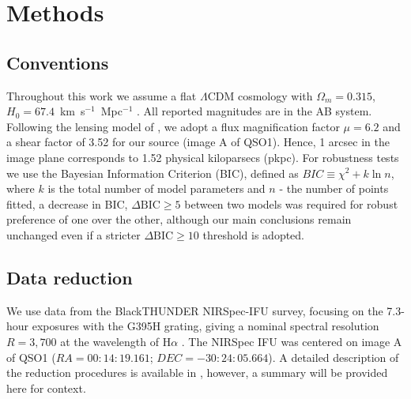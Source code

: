 \documentclass[twocolumn, fleqn]{doc_class}
\begin{document}
\clearpage
{}

\clearpage
\makeatletter
\renewcommand{\fnum@figure}{Extended Data Fig. \thefigure}
\renewcommand{\fnum@table}{Extended Data Table \thetable}
\makeatother
\setcounter{figure}{0}
\setcounter{table}{0}
\setcounter{footnote}{0}


\newpage


\section*{Methods}
\subsection*{Conventions}
Throughout this work we assume a flat $\Lambda$CDM cosmology with $\Omega_m = 0.315$, $H_0 = 67.4$~km~s$^{-1}$~Mpc$^{-1}$ . All reported magnitudes are in the AB system. Following the lensing model of , we adopt a flux magnification factor $\mu = 6.2$ and a shear factor of 3.52 for our source (image A of QSO1). Hence, 1 arcsec in the image plane corresponds to 1.52 physical kiloparsecs (pkpc). For robustness tests we use the Bayesian Information Criterion (BIC), defined as $BIC \equiv \chi^2 + k\ln{n}$, where $k$ is the total number of model parameters and $n$ - the number of points fitted, a decrease in BIC, $\Delta \mathrm{BIC} \geq 5$ between two models was required for robust preference of one over the other, although our main conclusions remain unchanged even if a stricter $\Delta \mathrm{BIC} \geq 10$ threshold is adopted.

\subsection*{Data reduction}
We use data from the BlackTHUNDER NIRSpec-IFU survey, focusing on the 7.3-hour exposures with the G395H grating, giving a nominal spectral resolution $R=3,700$ at the wavelength of H$\alpha$ .
The NIRSpec IFU was centered on image A of QSO1 ($RA=00:14:19.161$; $DEC=-30:24:05.664$).
A detailed description of the reduction procedures is available in , however, a summary will be provided here for context.
\end{document}
